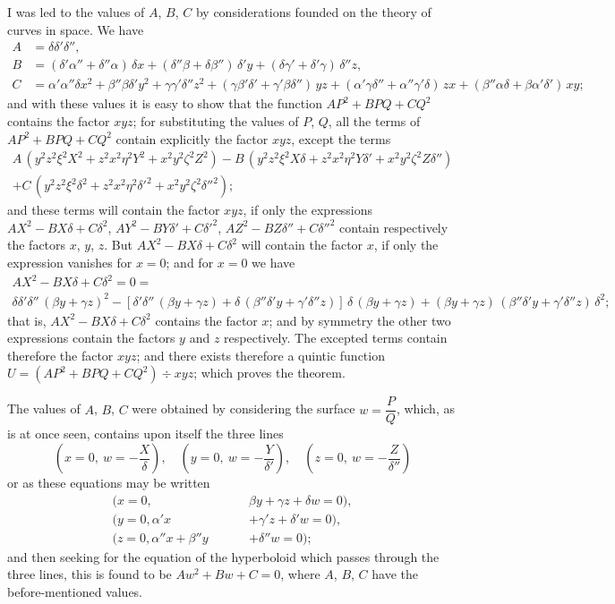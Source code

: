 \documentclass[11pt,a4paper]{article}
\begin{document}
I was led to the values of $A$, $B$, $C$ by considerations founded on the theory of
curves in space. We have
\begin{align*}
A &= \delta\delta'\delta'',\\
B &= (\delta'\alpha'' + \delta''\alpha)\,\delta x + (\delta''\beta + \delta\beta'')\,\delta' y + (\delta\gamma' + \delta'\gamma)\,\delta'' z,\\
C &= \alpha'\alpha''\delta x^2 + \beta''\beta\delta' y^2 + \gamma\gamma'\delta'' z^2 + (\gamma\beta'\delta' + \gamma'\beta\delta'')\,yz + (\alpha'\gamma\delta'' + \alpha''\gamma'\delta)\,zx + (\beta''\alpha\delta + \beta\alpha'\delta')\,xy;
\end{align*}
and with these values it is easy to show that the function $AP^2 + BPQ + CQ^2$ contains
the factor $xyz$; for substituting the values of $P$, $Q$, all the terms of $AP^2 + BPQ + CQ^2$
contain explicitly the factor $xyz$, except the terms
\begin{multline*}
A\,(y^2z^2\xi^2X^2 + z^2x^2\eta^2Y^2 + x^2y^2\zeta^2Z^2) - B\,(y^2z^2\xi^2X\delta + z^2x^2\eta^2Y\delta' + x^2y^2\zeta^2Z\delta'')\\
+ C\,(y^2z^2\xi^2\delta^2 + z^2x^2\eta^2\delta'^2 + x^2y^2\zeta^2\delta''^2);
\end{multline*}
and these terms will contain the factor $xyz$, if only the expressions $AX^2 - BX\delta + C\delta^2$,
$AY^2 - BY\delta' + C\delta'^2$, $AZ^2 - BZ\delta'' + C\delta''^2$ contain respectively the factors $x$, $y$, $z$. But
$AX^2 - BX\delta + C\delta^2$ will contain the factor $x$, if only the expression vanishes for $x=0$;
and for $x=0$ we have
\begin{multline*}
AX^2 - BX\delta + C\delta^2 = 0 =\\
\delta\delta'\delta''\,(\beta y + \gamma z)^2 - [\delta'\delta''\,(\beta y + \gamma z) + \delta\,(\beta''\delta' y + \gamma'\delta'' z)]\,\delta\,(\beta y + \gamma z) + (\beta y + \gamma z)\,(\beta''\delta' y + \gamma'\delta'' z)\,\delta^2;
\end{multline*}
that is, $AX^2 - BX\delta + C\delta^2$ contains the factor $x$; and by symmetry the other two
expressions contain the factors $y$ and $z$ respectively. The excepted terms contain therefore
the factor $xyz$; and there exists therefore a quintic function $U=(AP^2+BPQ+CQ^2)\div xyz$;
which proves the theorem.

The values of $A$, $B$, $C$ were obtained by considering the surface $w=\dfrac{P}{Q}$, which,
as is at once seen, contains upon itself the three lines
\[
\left(x=0,\ w=-\frac{X}{\delta}\right),\quad
\left(y=0,\ w=-\frac{Y}{\delta'}\right),\quad
\left(z=0,\ w=-\frac{Z}{\delta''}\right)
\]
or as these equations may be written
\begin{align*}
(x=0, \phantom{y=0,} &\beta y + \gamma z + \delta w = 0),\\
(y=0, \alpha'x \phantom{+\gamma'z} &+ \gamma' z + \delta' w = 0),\\
(z=0, \alpha''x + \beta''y \phantom{+\delta''w} &+ \delta'' w = 0);
\end{align*}
and then seeking for the equation of the hyperboloid which passes through the three
lines, this is found to be $Aw^2 + Bw + C = 0$, where $A$, $B$, $C$ have the before-mentioned
values.
\end{document}
